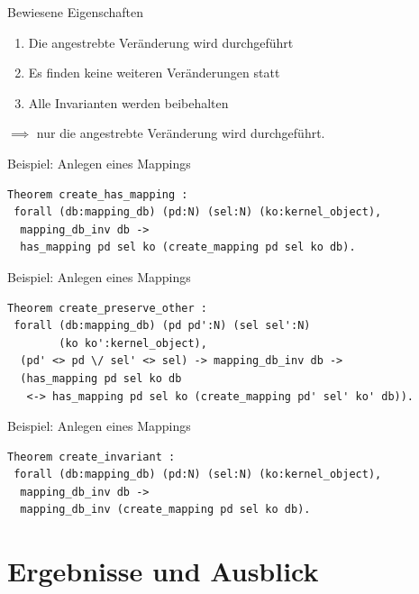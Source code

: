 \documentclass{beamer}
\begin{document}
\begin{frame}{Bewiesene Eigenschaften}
  \begin{enumerate}
    \item Die angestrebte Veränderung wird durchgeführt
    \item Es finden keine weiteren Veränderungen statt
    \item Alle Invarianten werden beibehalten 
  \end{enumerate}
  $\implies$ nur die angestrebte Veränderung wird durchgeführt.
\end{frame}

\begin{frame}[fragile]{Beispiel: Anlegen eines Mappings}
  \begin{verbatim}
Theorem create_has_mapping :
 forall (db:mapping_db) (pd:N) (sel:N) (ko:kernel_object),
  mapping_db_inv db -> 
  has_mapping pd sel ko (create_mapping pd sel ko db).
  \end{verbatim}
\end{frame}

\begin{frame}[fragile]{Beispiel: Anlegen eines Mappings}
  \begin{verbatim}
Theorem create_preserve_other :
 forall (db:mapping_db) (pd pd':N) (sel sel':N) 
        (ko ko':kernel_object),
  (pd' <> pd \/ sel' <> sel) -> mapping_db_inv db ->
  (has_mapping pd sel ko db
   <-> has_mapping pd sel ko (create_mapping pd' sel' ko' db)).
  \end{verbatim}
\end{frame}

\begin{frame}[fragile]{Beispiel: Anlegen eines Mappings}
  \begin{verbatim}
Theorem create_invariant :
 forall (db:mapping_db) (pd:N) (sel:N) (ko:kernel_object),
  mapping_db_inv db ->
  mapping_db_inv (create_mapping pd sel ko db).
  \end{verbatim}
\end{frame}

\section{Ergebnisse und Ausblick}
\end{document}
